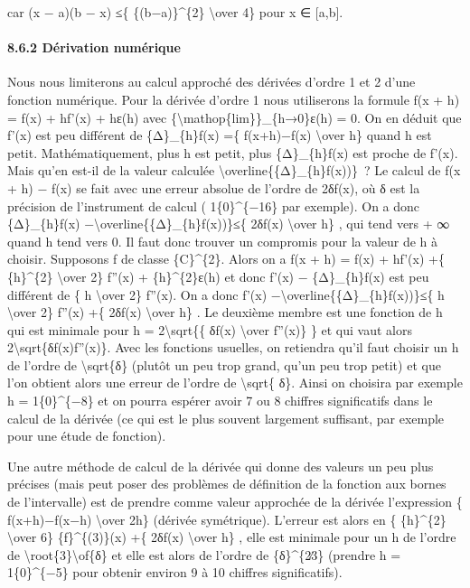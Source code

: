 \documentclass[]{article}
\begin{document}
car (x − a)(b − x) ≤\{ \{(b−a)\}\^{}\{2\} \textbackslash{}over 4\} pour
x ∈ {[}a,b{]}.

\paragraph{8.6.2 Dérivation numérique}

Nous nous limiterons au calcul approché des dérivées d'ordre 1 et 2
d'une fonction numérique. Pour la dérivée d'ordre 1 nous utiliserons la
formule f(x + h) = f(x) + hf'(x) + hε(h) avec
\{\textbackslash{}mathop\{lim\}\}\_\{h→0\}ε(h) = 0. On en déduit que
f'(x) est peu différent de \{Δ\}\_\{h\}f(x) =\{ f(x+h)−f(x)
\textbackslash{}over h\} quand h est petit. Mathématiquement, plus h est
petit, plus \{Δ\}\_\{h\}f(x) est proche de f'(x). Mais qu'en est-il de
la valeur calculée \textbackslash{}overline\{\{Δ\}\_\{h\}f(x))\}~? Le
calcul de f(x + h) − f(x) se fait avec une erreur absolue de l'ordre de
2δf(x), où δ est la précision de l'instrument de calcul (
1\{0\}\^{}\{−16\} par exemple). On a donc \textbar{}\{Δ\}\_\{h\}f(x)
−\textbackslash{}overline\{\{Δ\}\_\{h\}f(x))\}\textbar{}≤\{
2δ\textbar{}f(x)\textbar{} \textbackslash{}over h\} , qui tend vers + ∞
quand h tend vers 0. Il faut donc trouver un compromis pour la valeur de
h à choisir. Supposons f de classe \{C\}\^{}\{2\}. Alors on a f(x + h) =
f(x) + hf'(x) +\{ \{h\}\^{}\{2\} \textbackslash{}over 2\} f''(x) +
\{h\}\^{}\{2\}ε(h) et donc \textbar{}f'(x) − \{Δ\}\_\{h\}f(x)\textbar{}
est peu différent de \{ h \textbackslash{}over 2\}
\textbar{}f''(x)\textbar{}. On a donc \textbar{}f'(x)
−\textbackslash{}overline\{\{Δ\}\_\{h\}f(x))\}\textbar{}≤\{ h
\textbackslash{}over 2\} \textbar{}f''(x)\textbar{} +\{
2δ\textbar{}f(x)\textbar{} \textbackslash{}over h\} . Le deuxième membre
est une fonction de h qui est minimale pour h =
2\textbackslash{}sqrt\{\{ δ\textbar{}f(x)\textbar{} \textbackslash{}over
\textbar{}f''(x)\textbar{}\} \} et qui vaut alors
2\textbackslash{}sqrt\{δ\textbar{}f(x)f''(x)\textbar{}\}. Avec les
fonctions usuelles, on retiendra qu'il faut choisir un h de l'ordre de
\textbackslash{}sqrt\{δ\} (plutôt un peu trop grand, qu'un peu trop
petit) et que l'on obtient alors une erreur de l'ordre de
\textbackslash{}sqrt\{ δ\}. Ainsi on choisira par exemple h =
1\{0\}\^{}\{−8\} et on pourra espérer avoir 7 ou 8 chiffres
significatifs dans le calcul de la dérivée (ce qui est le plus souvent
largement suffisant, par exemple pour une étude de fonction).

Une autre méthode de calcul de la dérivée qui donne des valeurs un peu
plus précises (mais peut poser des problèmes de définition de la
fonction aux bornes de l'intervalle) est de prendre comme valeur
approchée de la dérivée l'expression \{ f(x+h)−f(x−h)
\textbackslash{}over 2h\} (dérivée symétrique). L'erreur est alors en \{
\{h\}\^{}\{2\} \textbackslash{}over 6\}
\textbar{}\{f\}\^{}\{(3)\}(x)\textbar{} +\{ 2δ\textbar{}f(x)\textbar{}
\textbackslash{}over h\} , elle est minimale pour un h de l'ordre de
\textbackslash{}root\{3\}\textbackslash{}of\{δ\} et elle est alors de
l'ordre de \{δ\}\^{}\{2∕3\} (prendre h = 1\{0\}\^{}\{−5\} pour obtenir
environ 9 à 10 chiffres significatifs).
\end{document}
